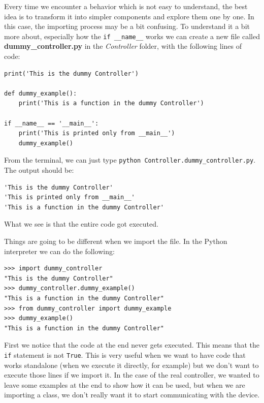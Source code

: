 Every time we encounter a behavior which is not easy to understand, the best idea is to transform it into simpler components and explore them one by one. In this case, the importing process may be a bit confusing. To understand it a bit more about, especially how the \texttt{if __name__} works we can create a new file called \textbf{dummy\_controller.py} in the \emph{Controller} folder, with the following lines of code:

\begin{verbatim}
print('This is the dummy Controller')

def dummy_example():
    print('This is a function in the dummy Controller')

if __name__ == '__main__':
    print('This is printed only from __main__')
    dummy_example()

\end{verbatim}

From the terminal, we can just type \texttt{python Controller.dummy\_controller.py}. The output should be:

\begin{verbatim}
'This is the dummy Controller'
'This is printed only from __main__'
'This is a function in the dummy Controller'
\end{verbatim}

What we see is that the entire code got executed.


Things are going to be different when we import the file. In the Python interpreter we can do the following:

\begin{verbatim}
>>> import dummy_controller
"This is the dummy Controller"
>>> dummy_controller.dummy_example()
"This is a function in the dummy Controller"
>>> from dummy_controller import dummy_example
>>> dummy_example()
"This is a function in the dummy Controller"
\end{verbatim}

First we notice that the code at the end never gets executed. This means that the \texttt{if} statement is not \texttt{True}. This is very useful when we want to have code that works standalone (when we execute it directly, for example) but we don't want to execute those lines if we import it. In the case of the real controller, we wanted to leave some examples at the end to show how it can be used, but when we are importing a class, we don't really want it to start communicating with the device.

